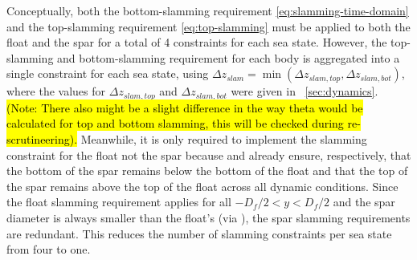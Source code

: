 Conceptually, both the bottom-slamming requirement \eqref{eq:slamming-time-domain} and the top-slamming requirement \eqref{eq:top-slamming} must be applied to both the float and the spar for a total of 4 constraints for each sea state.
However, the top-slamming and bottom-slamming requirement for each body is aggregated into a single constraint for each sea state, using $\Delta z_{slam}=\min(\Delta z_{slam,top}, \Delta z_{slam,bot})$, where the values for $\Delta z_{slam,top}$ and $\Delta z_{slam,bot}$ were given in \sectionautorefname~\ref{sec:dynamics}.
\hl{(Note: There also might be a slight difference in the way theta would be calculated for top and bottom slamming, this will be checked during re-scrutineering).}
Meanwhile, it is only required to implement the slamming constraint for the float not the spar because  and  already ensure, respectively, that the bottom of the spar remains below the bottom of the float and that the top of the spar remains above the top of the float across all dynamic conditions.
Since the float slamming requirement applies for all $-D_f/2<y<D_f/2$ and the spar diameter is always smaller than the float's (via ), the spar slamming requirements are redundant. This reduces the number of slamming constraints per sea state from four to one.

